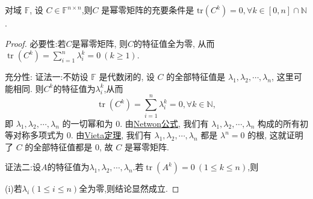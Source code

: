 \documentclass[../../main.tex]{subfiles}%
\begin{document}
\begin{theorem}\label{theorem:幂零矩阵关于迹的充要条件}
对域 \( \mathbb{F} \), 设 \( C \in \mathbb{F}^{n \times n} \),则\( C \) 是幂零矩阵的充要条件是 \( \mathrm{tr}(C^k) = 0, \forall k \in [0,n]\cap \mathbb{N} \).
\end{theorem}
\begin{proof}

{\heiti 必要性:}若$C$是幂零矩阵, 则$C$的特征值全为零, 从而$\operatorname{tr}(C^k) = \sum_{i=1}^n \lambda_i^k = 0 \ (k \geqslant  1)$. 

{\heiti 充分性:}
{\color{blue}证法一:}不妨设 \( \mathbb{F} \) 是代数闭的, 设 \( C \) 的全部特征值是 \( \lambda_1, \lambda_2, \cdots, \lambda_n \), 这里可能相同. 则$C^k$的特征值为$\lambda_i^k$,从而
\[
\operatorname{tr}(C^k)=\sum_{i=1}^n \lambda_i^k = 0, \forall k \in \mathbb{N},
\]
即 \( \lambda_1, \lambda_2, \cdots, \lambda_n \) 的一切幂和为 0. 由\hyperref[theorem:Netwon公式]{Netwon公式}, 我们有 \( \lambda_1, \lambda_2, \cdots, \lambda_n \) 构成的所有初等对称多项式为 0. 由\hyperref[theorem:Vieta定理]{Vieta定理}, 我们有 \( \lambda_1, \lambda_2, \cdots, \lambda_n \) 都是 \( \lambda^n = 0 \) 的根, 这就证明了 \( C \) 的全部特征值都是 0, 故 \( C \) 是幂零矩阵.

{\color{blue}证法二:}设$A$的特征值为$\lambda_1, \lambda_2, \cdots, \lambda_n$.若$\operatorname{tr}(A^k) = 0 \ (1 \leqslant  k \leqslant  n)$,则

(i)若$\lambda_i(1\leqslant  i\leqslant  n)$全为零,则结论显然成立.


\end{proof}
\end{document}
